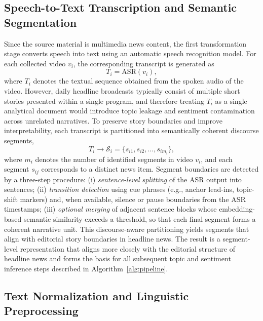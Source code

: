 \documentclass[final,1p,times]{elsarticle}
\begin{document}
\subsection{Speech-to-Text Transcription and Semantic Segmentation}

Since the source material is multimedia news content, the first transformation stage converts speech into text using an automatic speech recognition model. For each collected video $v_i$, the corresponding transcript is generated as
\begin{equation}
T_i = \mathrm{ASR}(v_i),
\end{equation}
where $T_i$ denotes the textual sequence obtained from the spoken audio of the video. However, daily headline broadcasts typically consist of multiple short stories presented within a single program, and therefore treating $T_i$ as a single analytical document would introduce topic leakage and sentiment contamination across unrelated narratives. To preserve story boundaries and improve interpretability, each transcript is partitioned into semantically coherent discourse segments,
\begin{equation}
T_i \rightarrow \mathcal{S}_i = \{s_{i1}, s_{i2}, \dots, s_{im_i}\},
\end{equation}
where $m_i$ denotes the number of identified segments in video $v_i$, and each segment $s_{ij}$ corresponds to a distinct news item. Segment boundaries are detected by a three-step procedure: (i) \emph{sentence-level splitting} of the ASR output into sentences; (ii) \emph{transition detection} using cue phrases (e.g., anchor lead-ins, topic-shift markers) and, when available, silence or pause boundaries from the ASR timestamps; (iii) \emph{optional merging} of adjacent sentence blocks whose embedding-based semantic similarity exceeds a threshold, so that each final segment forms a coherent narrative unit. This discourse-aware partitioning yields segments that align with editorial story boundaries in headline news. The result is a segment-level representation that aligns more closely with the editorial structure of headline news and forms the basis for all subsequent topic and sentiment inference steps described in Algorithm~\ref{alg:pipeline}.

\subsection{Text Normalization and Linguistic Preprocessing}
\end{document}
